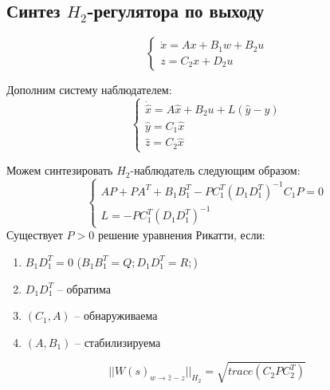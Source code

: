 \subsection{Синтез $H_2$-регулятора по выходу}
\[
        \begin{cases}
                \dot{x} = A x + B_1 w + B_2 u \\
                z = C_2x + D_2 u  
        \end{cases}
\]

Дополним систему наблюдателем:
\begin{equation}
    \begin{cases}
        \dot{\hat{x}} = A\hat{x} + B_2u + L(\hat{y} - y)\\
        \hat{y} = C_1\hat{x} \\
        \hat{z} = C_2\hat{x}
    \end{cases}
\end{equation}

Можем синтезировать $H_2$-наблюдатель следующим образом:
\begin{equation}
    \begin{cases}
        AP + PA^T + B_1B_1^T - PC_1^T(D_1D_1^T)^{-1}C_1P = 0\\
        L = -PC_1^T(D_1D_1^T)^{-1}
    \end{cases}
\end{equation}
Существует \(P > 0\) решение уравнения Рикатти, если:
\begin{enumerate}
  \item \(B_1D_1^T = 0\) (\(B_1B_1^T = Q; D_1D_1^T = R;\))
  \item \(D_1D_1^T\) -- обратима
  \item \((C_1, A)\) -- обнаруживаема
  \item \((A, B_1)\) -- стабилизируема
\end{enumerate}
\[||W(s)_{w \rightarrow \hat{z} - z}||_{H_2} = \sqrt{trace(C_2 P C_2^T)}\]

